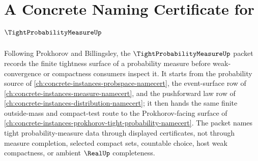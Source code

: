 \chapter{A Concrete Naming Certificate for $\TightProbabilityMeasureUp$}
\label{ch:concrete-instances-tight-probability-measure-namecert}

Following Prokhorov and Billingsley, the $\TightProbabilityMeasureUp$ packet records the finite tightness surface of a probability measure before weak-convergence or compactness consumers inspect it. It starts from the probability source of \autoref{ch:concrete-instances-probspace-namecert}, the event-surface row of \autoref{ch:concrete-instances-measure-namecert}, and the pushforward law row of \autoref{ch:concrete-instances-distribution-namecert}; it then hands the same finite outside-mass and compact-test route to the Prokhorov-facing surface of \autoref{ch:concrete-instances-prokhorov-tight-probability-namecert}. The packet names tight probability-measure data through displayed certificates, not through measure completion, selected compact sets, countable choice, host weak compactness, or ambient $\RealUp$ completeness.

